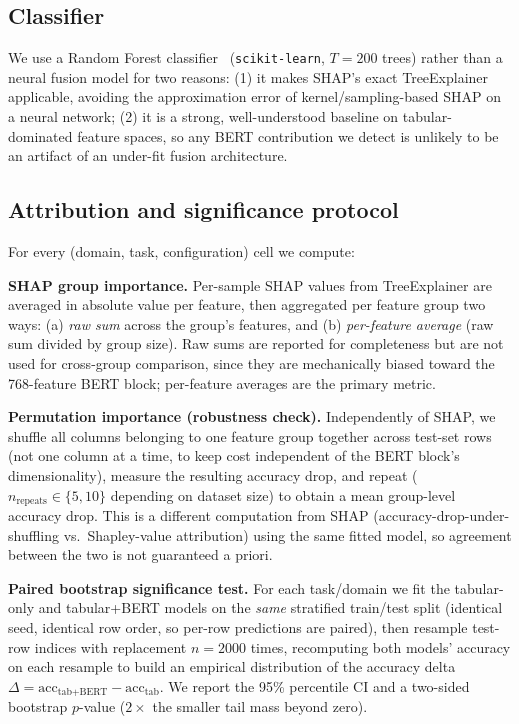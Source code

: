 \documentclass[conference]{IEEEtran}
\begin{document}
\subsection{Classifier}
We use a Random Forest classifier~\cite{breiman2001random} (\texttt{scikit-learn}, $T{=}200$ trees) rather than a neural fusion model for two reasons: (1) it makes SHAP's exact TreeExplainer applicable, avoiding the approximation error of kernel/sampling-based SHAP on a neural network; (2) it is a strong, well-understood baseline on tabular-dominated feature spaces, so any BERT contribution we detect is unlikely to be an artifact of an under-fit fusion architecture.

\subsection{Attribution and significance protocol}
\label{sec:protocol}
For every (domain, task, configuration) cell we compute:

\textbf{SHAP group importance.} Per-sample SHAP values from TreeExplainer are averaged in absolute value per feature, then aggregated per feature group two ways: (a) \emph{raw sum} across the group's features, and (b) \emph{per-feature average} (raw sum divided by group size). Raw sums are reported for completeness but are not used for cross-group comparison, since they are mechanically biased toward the 768-feature BERT block; per-feature averages are the primary metric.

\textbf{Permutation importance (robustness check).} Independently of SHAP, we shuffle all columns belonging to one feature group together across test-set rows (not one column at a time, to keep cost independent of the BERT block's dimensionality), measure the resulting accuracy drop, and repeat ($n_{\text{repeats}}\in\{5,10\}$ depending on dataset size) to obtain a mean group-level accuracy drop. This is a different computation from SHAP (accuracy-drop-under-shuffling vs.\ Shapley-value attribution) using the same fitted model, so agreement between the two is not guaranteed a priori.

\textbf{Paired bootstrap significance test.} For each task/domain we fit the tabular-only and tabular+BERT models on the \emph{same} stratified train/test split (identical seed, identical row order, so per-row predictions are paired), then resample test-row indices with replacement $n{=}2000$ times, recomputing both models' accuracy on each resample to build an empirical distribution of the accuracy delta $\Delta = \text{acc}_{\text{tab+BERT}} - \text{acc}_{\text{tab}}$. We report the 95\% percentile CI and a two-sided bootstrap $p$-value ($2\times$ the smaller tail mass beyond zero).
\end{document}
